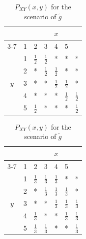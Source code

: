 \documentclass[journal, onecolumn, draftcls]{IEEEtran}
\theoremstyle{definition}
\begin{document}
\begin{table}[h]
\centering 
\begin{minipage}{.32\textwidth}
  \centering
  \begin{tabular}{c|c|ccccc}
    \multicolumn{2}{c|}{} & \multicolumn{5}{c}{\( x \)} \\
    \cline{3-7}
    \multicolumn{2}{c|}{\multirow{-2}{*}{\( P_{XY}(x,y) \)}} & 1 & 2 & 3 & 4 & 5 \\
    \hline
    \multirow{5}{*}{\( y \)} 
    & 1 & $\frac{1}{2}$ & $\frac{1}{2}$ & * & * & * \\
    & 2 & * & $\frac{1}{2}$ & $\frac{1}{2}$ & * & * \\
    & 3 & * & * & $\frac{1}{2}$ & $\frac{1}{2}$ & * \\
    & 4 & * & * & * & $\frac{1}{2}$ & $\frac{1}{2}$ \\
    & 5 & $\frac{1}{2}$ & * & * & * & $\frac{1}{2}$ \vspace{3mm}
  \end{tabular} 
  \caption{$P_{XY}(x,y)$ for the scenario of $\tilde f$}
  \label{table:simple_eg1_pxy}
\end{minipage}%
\quad\quad
\begin{minipage}{.32\textwidth}
  \centering
  \begin{tabular}{c|c|ccccc}
    \multicolumn{2}{c|}{} & \multicolumn{5}{c}{\( x \)} \\
    \cline{3-7}
    \multicolumn{2}{c|}{\multirow{-2}{*}{\( P_{XY}(xy) \)}} & 1 & 2 & 3 & 4 & 5 \\
    \hline
    \multirow{5}{*}{\( y \)} 
    & 1 & $\frac{1}{3}$ & $\frac{1}{3}$ & $\frac{1}{3}$ & * & * \\
    & 2 & * & $\frac{1}{3}$ & $\frac{1}{3}$ & $\frac{1}{3}$ & * \\
    & 3 & * & * & $\frac{1}{3}$ & $\frac{1}{3}$ & $\frac{1}{3}$ \\
    & 4 & $\frac{1}{3}$ & * & * & $\frac{1}{3}$ & $\frac{1}{3}$ \\
    & 5 & $\frac{1}{3}$ & $\frac{1}{3}$ & * & * & $\frac{1}{3}$ \vspace{3mm}
  \end{tabular}
  \caption{$P_{XY}(x,y)$ for the scenario of  $\tilde g$}
  \label{table:simple_eg2_pxy}
\end{minipage}  
\end{table}  
\end{document}
